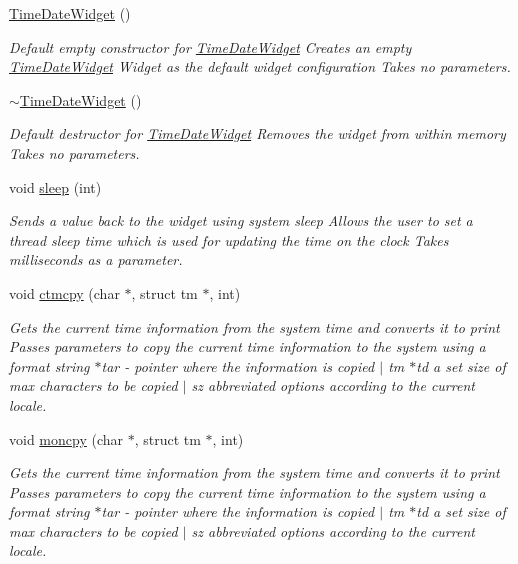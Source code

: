 \begin{DoxyCompactItemize}
\item 
\mbox{\hyperlink{class_time_date_widget_a661a209376b099776bdb2cdf3b29b7be}{Time\+Date\+Widget}} ()
\begin{DoxyCompactList}\small\item\em Default empty constructor for \mbox{\hyperlink{class_time_date_widget}{Time\+Date\+Widget}}  Creates an empty \mbox{\hyperlink{class_time_date_widget}{Time\+Date\+Widget}} Widget as the default widget configuration  Takes no parameters. \end{DoxyCompactList}\item 
\mbox{\hyperlink{class_time_date_widget_aa52cfdaaa44a82ef169b2f368130e1de}{$\sim$\+Time\+Date\+Widget}} ()
\begin{DoxyCompactList}\small\item\em Default destructor for \mbox{\hyperlink{class_time_date_widget}{Time\+Date\+Widget}}  Removes the widget from within memory  Takes no parameters. \end{DoxyCompactList}\item 
void \mbox{\hyperlink{class_time_date_widget_aae23752646a1d3d0185118a50c2f6029}{sleep}} (int)
\begin{DoxyCompactList}\small\item\em Sends a value back to the widget using system sleep  Allows the user to set a thread sleep time which is used for updating the time on the clock  Takes milliseconds as a parameter. \end{DoxyCompactList}\item 
void \mbox{\hyperlink{class_time_date_widget_a7435370eaf6bfbbef35708a0444505a1}{ctmcpy}} (char $\ast$, struct tm $\ast$, int)
\begin{DoxyCompactList}\small\item\em Gets the current time information from the system time and converts it to print  Passes parameters to copy the current time information to the system using a format string  $\ast$tar -\/ pointer where the information is copied $\vert$ tm $\ast$td a set size of max characters to be copied $\vert$ sz abbreviated options according to the current locale. \end{DoxyCompactList}\item 
void \mbox{\hyperlink{class_time_date_widget_a48922ee8b0b5ffdddbf1f88183ca681a}{moncpy}} (char $\ast$, struct tm $\ast$, int)
\begin{DoxyCompactList}\small\item\em Gets the current time information from the system time and converts it to print  Passes parameters to copy the current time information to the system using a format string  $\ast$tar -\/ pointer where the information is copied $\vert$ tm $\ast$td a set size of max characters to be copied $\vert$ sz abbreviated options according to the current locale. \end{DoxyCompactList}\item 

\end{DoxyCompactItemize}
